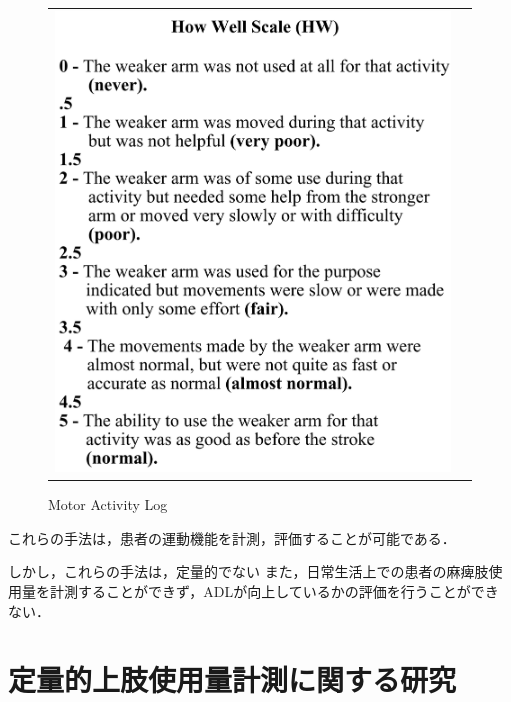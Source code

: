 \begin{figure}[H]
\begin{center}
\begin{tabular}{cc}
{\includegraphics[scale=0.3]{fig/ch1/how}
} \\
\end{tabular}
\end{center}
   \caption{Motor Activity Log}
\label{fig:Motor Activity Log}
\end{figure}

これらの手法は，患者の運動機能を計測，評価することが可能である．

しかし，これらの手法は，定量的でない
また，日常生活上での患者の麻痺肢使用量を計測することができず，ADLが向上しているかの評価を行うことができない．



\section{定量的上肢使用量計測に関する研究}

